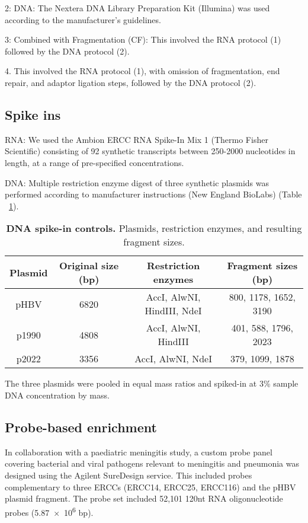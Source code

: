 2: DNA: The Nextera DNA Library Preparation Kit (Illumina) was used according to the manufacturer's guidelines.

3: Combined with Fragmentation (CF): This involved the RNA protocol (1) followed by the DNA protocol (2).

4. This involved the RNA protocol (1), with omission of fragmentation, end repair, and adaptor ligation steps, followed by the DNA protocol (2). 

\subsection{Spike ins}
RNA: We used the Ambion ERCC RNA Spike-In Mix 1 (Thermo Fisher Scientific) consisting of 92 synthetic transcripts between 250-2000 nucleotides in length, at a range of pre-specified concentrations\cite{Rna2005}.

DNA: Multiple restriction enzyme digest of three synthetic plasmids was performed according to manufacturer instructions (New England BioLabs) (Table ~\ref{tab:plasmid}). 

\begin{table}[htbp]
\begin{center}
\begin{tabular}{|c|c|c|c|}
\hline
Plasmid & Original size (bp) & Restriction enzymes & Fragment sizes (bp)\\
\hline
pHBV & 6820 & AccI, AlwNI, HindIII, NdeI & 800, 1178, 1652, 3190\\
p1990 & 4808 & AccI, AlwNI, HindIII & 401, 588, 1796, 2023\\
p2022 & 3356 & AccI, AlwNI, NdeI & 379, 1099, 1878\\
\hline
\end{tabular}
\end{center}
\smallskip
\caption[plasmid]{\textbf{DNA spike-in controls.} Plasmids, restriction enzymes, and resulting fragment sizes.}
\label{tab:plasmid}
\end{table}

The three plasmids were pooled in equal mass ratios and spiked-in at 3\% sample DNA concentration by mass.

\subsection{Probe-based enrichment}
In collaboration with a paediatric meningitis study, a custom probe panel covering bacterial and viral pathogens relevant to meningitis and pneumonia was designed using the Agilent SureDesign service. This included probes complementary to three ERCCs (ERCC14, ERCC25, ERCC116) and the pHBV plasmid fragment. The probe set included 52,101 120nt RNA oligonucleotide probes (\num{5.87e6} bp). 

